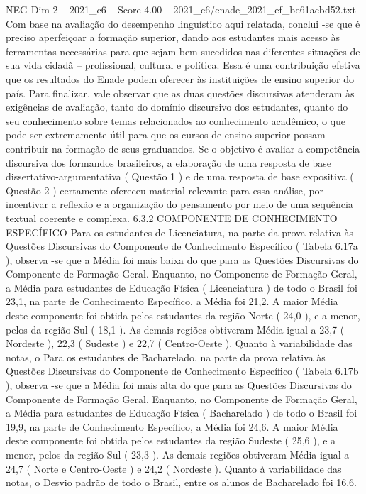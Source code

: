 \begin{textsample}{NEG Dim 2 – 2021\_c6 – Score 4.00 – 2021\_c6/enade\_2021\_ef\_be61acbd52.txt}
Com base na avaliação do desempenho linguístico aqui relatada, conclui -se que é preciso aperfeiçoar a formação superior, dando aos estudantes mais acesso às ferramentas necessárias para que sejam bem-sucedidos nas diferentes situações de sua vida cidadã – profissional, cultural e política.
Essa é uma contribuição efetiva que os resultados do Enade podem oferecer às instituições de ensino superior do país.
Para finalizar, vale observar que as duas questões discursivas atenderam às exigências de avaliação, tanto do domínio discursivo dos estudantes, quanto do seu conhecimento sobre temas relacionados ao conhecimento acadêmico, o que pode ser extremamente útil para que os cursos de ensino superior possam contribuir na formação de seus graduandos.
Se o objetivo é avaliar a competência discursiva dos formandos brasileiros, a elaboração de uma resposta de base dissertativo-argumentativa ( Questão 1 ) e de uma resposta de base expositiva ( Questão 2 ) certamente ofereceu material relevante para essa análise, por incentivar a reflexão e a organização do pensamento por meio de uma sequência textual coerente e complexa. 6.3.2 COMPONENTE DE CONHECIMENTO ESPECÍFICO Para os estudantes de Licenciatura, na parte da prova relativa às Questões Discursivas do Componente de Conhecimento Específico ( Tabela 6.17a ), observa -se que a Média foi mais baixa do que para as Questões Discursivas do Componente de Formação Geral.
Enquanto, no Componente de Formação Geral, a Média para estudantes de Educação Física ( Licenciatura ) de todo o Brasil foi 23,1, na parte de Conhecimento Específico, a Média foi 21,2.
A maior Média deste componente foi obtida pelos estudantes da região Norte ( 24,0 ), e a menor, pelos da região Sul ( 18,1 ).
As demais regiões obtiveram Média igual a 23,7 ( Nordeste ), 22,3 ( Sudeste ) e 22,7 ( Centro-Oeste ).
Quanto à variabilidade das notas, o Para os estudantes de Bacharelado, na parte da prova relativa às Questões Discursivas do Componente de Conhecimento Específico ( Tabela 6.17b ), observa -se que a Média foi mais alta do que para as Questões Discursivas do Componente de Formação Geral.
Enquanto, no Componente de Formação Geral, a Média para estudantes de Educação Física ( Bacharelado ) de todo o Brasil foi 19,9, na parte de Conhecimento Específico, a Média foi 24,6.
A maior Média deste componente foi obtida pelos estudantes da região Sudeste ( 25,6 ), e a menor, pelos da região Sul ( 23,3 ).
As demais regiões obtiveram Média igual a 24,7 ( Norte e Centro-Oeste ) e 24,2 ( Nordeste ).
Quanto à variabilidade das notas, o Desvio padrão de todo o Brasil, entre os alunos de Bacharelado foi 16,6.

\end{textsample}
